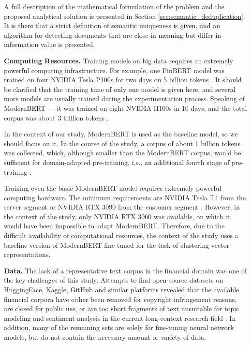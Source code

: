 A full description of the mathematical formulation of the problem and the proposed analytical
solution is presented in Section \ref{sec:semantic_deduplication}. It is there that a strict
definition of semantic uniqueness is given, and an algorithm for detecting documents that
are close in meaning but differ in information value is presented.

\textbf{Computing Resources.} Training models on big data requires an extremely powerful computing
infrastructure. For example, one FinBERT model was trained on four NVIDIA Tesla P100s for two
days on 5 billion tokens \parencite{Yang2020FinBERT}. It should be clarified that the training time of only one
model is given here, and several more models are usually trained during the experimentation
process. Speaking of ModernBERT --- it was trained on eight NVIDIA H100s in 10 days, and the total
corpus was about 3 trillion tokens \parencite{Warner2024ModernBERT}.

In the context of our study, ModernBERT is used as the baseline model, so we should focus on it.
In the course of the study, a corpus of about 1 billion tokens was collected, which, although smaller
than the ModernBERT corpus, would be sufficient for domain-adapted pre-training, i.e., an additional
fourth stage of pre-training \parencite{Warner2024ModernBERT,gururangan2020DAPT}.

Training even the basic ModernBERT model requires extremely powerful computing hardware. The minimum
requirements are NVIDIA Tesla T4 from the server segment or NVIDIA RTX 3090 from the customer segment
\parencite{Warner2024ModernBERT}. However, in the context of the study, only NVIDIA RTX 3060 was available,
on which it would have been impossible to adapt ModernBERT. Therefore, due to the difficult availability
of computational resources, the context of the study uses a baseline version of ModernBERT fine-tuned
for the task of clustering vector representations.

\textbf{Data.} The lack of a representative text corpus in the financial domain was one of the key challenges
of this study. Attempts to find open-source datasets on HuggingFace, Kaggle, GitHub and similar platforms
revealed that the available financial corpora have either been removed for copyright infringement reasons,
are closed for public use, or are too short fragments of text unsuitable for topic modeling and sentiment
analysis in the current long-context research field
\parencite{FiQA2018SA, Malo2014FPB, daudert2022multi, xing2020financial, wiebe2005annotating}.
In addition, many of the remaining sets are solely for fine-tuning neural network models, but do not
contain the necessary amount or variety of data.

